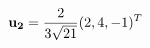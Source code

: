 \documentclass[preview]{standalone}
\begin{document}
\begin{align*}
\mathbf{u_2} = { 2 \over 3 \sqrt{21} } (2, 4, -1)^T
\end{align*}
\end{document}
